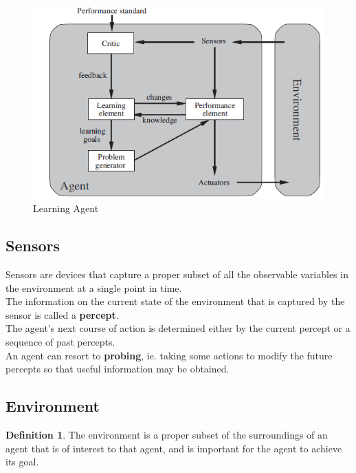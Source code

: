 \documentclass{article}
\theoremstyle{plain}
\theoremstyle{definition}
\newtheorem{defn}{Definition} %
\begin{document}
\begin{enumerate}
\begin{enumerate}
            \begin{figure}[ht]
                \centering
                \includegraphics{ml4.png}
                \caption{Learning Agent}
                \label{fig:my_label_4}
            \end{figure}

        \end{enumerate}
    \end{enumerate}
    
     
    
    \subsection{Sensors}
    
    Sensors are devices that capture a proper subset of all the observable variables in the environment at a single point in time. \\
    The information on the current state of the environment that is captured by the sensor is called a \textbf{percept}.\\
    The agent's next course of action is determined either by the current percept or a sequence of past percepts.\\
    An agent can resort to \textbf{probing}, ie. taking some actions to modify the future percepts so that useful information may be obtained. 
    
    \subsection{Environment}
    \begin{defn}
    The environment is a proper subset of the surroundings of an agent that is of interest to that agent, and is important for the agent to achieve its goal.
    \end{defn}
    
\end{document}
